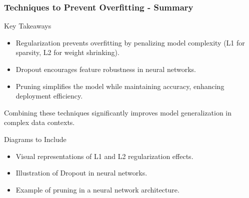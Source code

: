 \documentclass[aspectratio=169]{beamer}
\begin{document}
\begin{frame}[fragile]
    \frametitle{Techniques to Prevent Overfitting - Summary}
    \begin{block}{Key Takeaways}
        \begin{itemize}
            \item Regularization prevents overfitting by penalizing model complexity (L1 for sparsity, L2 for weight shrinking).
            \item Dropout encourages feature robustness in neural networks.
            \item Pruning simplifies the model while maintaining accuracy, enhancing deployment efficiency.
        \end{itemize}
        \item Combining these techniques significantly improves model generalization in complex data contexts.
    \end{block}
    \begin{block}{Diagrams to Include}
        \begin{itemize}
            \item Visual representations of L1 and L2 regularization effects.
            \item Illustration of Dropout in neural networks.
            \item Example of pruning in a neural network architecture.
        \end{itemize}
    \end{block}
\end{frame}
\end{document}
